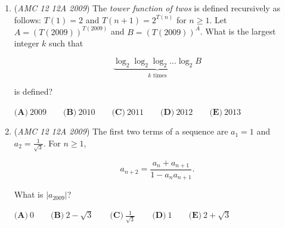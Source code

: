 \begin{enumerate}
	\item (\textit{AMC 12 12A 2009}) The \textit{tower function of twos} is defined recursively as follows: $T(1) = 2$ and $T(n + 1) = 2^{T(n)}$ for $n\ge1$. Let $A = (T(2009))^{T(2009)}$ and $B = (T(2009))^A$. What is the largest integer $k$ such that


 
 \[\underbrace{\log_2\log_2\log_2\ldots\log_2B}_{k\text{ times}}\]


 is defined?


 $\textbf{(A)}\ 2009\qquad \textbf{(B)}\ 2010\qquad \textbf{(C)}\ 2011\qquad \textbf{(D)}\ 2012\qquad \textbf{(E)}\ 2013$


	\item (\textit{AMC 12 12A 2009}) The first two terms of a sequence are $a_1 = 1$ and $a_2 = \frac {1}{\sqrt3}$. For $n\ge1$,


 
 \[a_{n + 2} = \frac {a_n + a_{n + 1}}{1 - a_na_{n + 1}}.\]

 What is $|a_{2009}|$?


 $\textbf{(A)}\ 0\qquad \textbf{(B)}\ 2 - \sqrt3\qquad \textbf{(C)}\ \frac {1}{\sqrt3}\qquad \textbf{(D)}\ 1\qquad \textbf{(E)}\ 2 + \sqrt3$


\end{enumerate}
